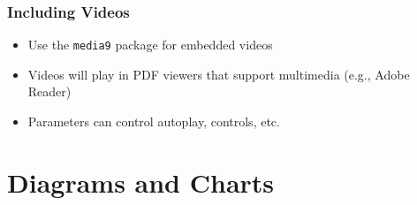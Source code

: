 \documentclass[aspectratio=169,professionalfonts]{beamer}
\begin{document}
\begin{frame}
    \frametitle{Including Videos}
    
    \begin{center}
    \end{center}
    
    \begin{tcolorbox}[colback=ugmLightGrey,colframe=ugmBlue,title=Video Tip]
        \begin{itemize}
            \item Use the \texttt{media9} package for embedded videos
            \item Videos will play in PDF viewers that support multimedia (e.g., Adobe Reader)
            \item Parameters can control autoplay, controls, etc.
        \end{itemize}
    \end{tcolorbox}
\end{frame}

\section{Diagrams and Charts}
\end{document}

